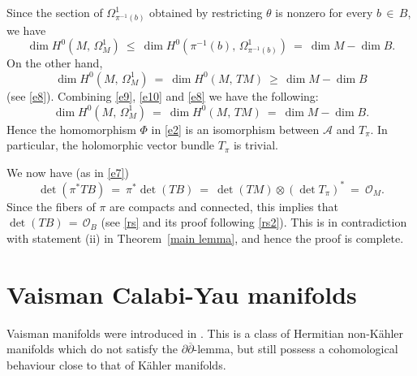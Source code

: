 \documentclass[12pt,reqno]{amsart}
\theoremstyle{definition}
\numberwithin{equation}{section}
\begin{document}
Since the section of $\Omega^1_{\pi^{-1}(b)}$ obtained by restricting $\theta$ is nonzero for every
$b\, \in\, B$, we have
\begin{equation}\label{e9}
\dim H^0(M,\, \Omega^1_M) \ \leq\ \dim H^0(\pi^{-1}(b),\, \Omega^1_{\pi^{-1}(b)})\ =\ \dim M - \dim B.
\end{equation}
On the other hand,
\begin{equation}\label{e10}
\dim H^0(M,\, \Omega^1_M) \ = \ \dim H^0(M,\, TM) \ \geq\, \dim M - \dim B
\end{equation}
(see \eqref{e8}). Combining \eqref{e9}, \eqref{e10} and \eqref{e8} we have the following:
$$
\dim H^0(M,\, \Omega^1_M) \ =\ \dim H^0(M,\, TM) \ =\ \dim M - \dim B.
$$
Hence the homomorphism $\Phi$ in \eqref{e2} is an isomorphism between $\mathcal A$ and $T_\pi$.
In particular, the holomorphic vector bundle $T_\pi$ is trivial. 

We now have (as in \eqref{e7})
$$
\det (\pi^*TB)\ =\ \pi^*\det (TB) \ =\ \det (TM)\otimes (\det T_\pi)^* \ =\ {\mathcal O}_M.
$$
Since the fibers of $\pi$ are compacts and  connected, this implies that $\det (TB)\,=\, {\mathcal O}_B$ (see
\eqref{rs} and its proof following \eqref{rs2}). This is in contradiction with statement (ii) in Theorem~\ref{main lemma}, and
hence the proof is complete.

\section{Vaisman Calabi-Yau manifolds}\label{section Vaisman} 

Vaisman manifolds were introduced in \cite{Va1}. This is a class of Hermitian non-K\"ahler manifolds which 
do not satisfy the $\partial \overline{\partial}$-lemma, but still possess a cohomological behaviour close to 
that of K\"ahler manifolds.
\end{document}
